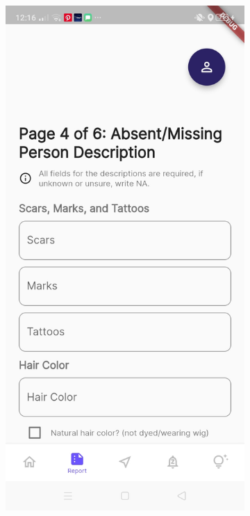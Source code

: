 \begin{figure}[!h]
    \centering
    \begin{subfigure}[c]{0.40\linewidth}
        \centering
        \includegraphics[scale=0.15]{figures/Chapter4/Main/p4-1.jpg}

\end{subfigure}
\end{figure}
